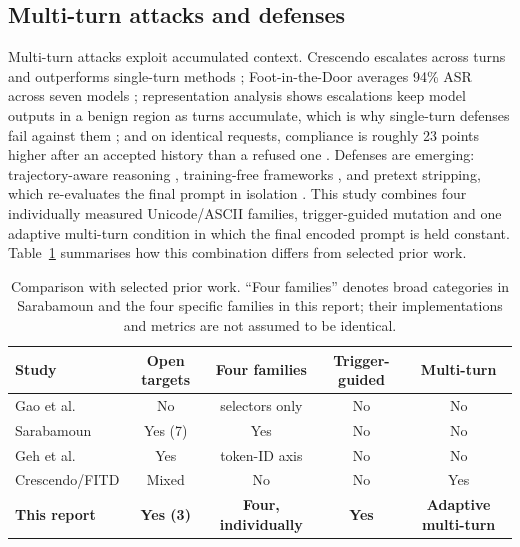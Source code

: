 \documentclass[a4paper,12pt]{article}
\begin{document}
\subsection{Multi-turn attacks and defenses}

Multi-turn attacks exploit accumulated context. Crescendo escalates across turns and
outperforms single-turn methods \cite{russinovich2024crescendo}; Foot-in-the-Door
averages 94\% ASR across seven models \cite{weng2025fitd}; representation analysis
shows escalations keep model outputs in a benign region as turns accumulate, which
is why single-turn defenses fail against them \cite{bullwinkel2025multiturn}; and on
identical requests, compliance is roughly 23 points higher after an accepted history
than a refused one \cite{hong2026threebench}. Defenses are emerging: trajectory-aware
reasoning \cite{chen2026trace}, training-free frameworks
\cite{zhang2026thrd}, and pretext stripping, which re-evaluates the final prompt in
isolation \cite{kumarappan2026deception}. This study combines four individually
measured Unicode/ASCII families, trigger-guided mutation and one adaptive multi-turn
condition in which the final encoded prompt is held constant. Table~\ref{tab:gap}
summarises how this combination differs from selected prior work.

\begin{table}[htbp]
\centering
\small
\begin{tabular}{p{3.4cm}cccc}
\toprule
Study & Open targets & Four families & Trigger-guided & Multi-turn \\
\midrule
Gao et al.\ \cite{pang2025imperceptible} & No & selectors only & No & No \\
Sarabamoun \cite{sarabamoun2025special} & Yes (7) & Yes & No & No \\
Geh et al.\ \cite{geh2025advtok} & Yes & token-ID axis & No & No \\
Crescendo/FITD \cite{russinovich2024crescendo,weng2025fitd} & Mixed & No & No & Yes \\
\textbf{This report} & \textbf{Yes (3)} & \textbf{Four, individually} & \textbf{Yes} & \textbf{Adaptive multi-turn} \\
\bottomrule
\end{tabular}
\caption{Comparison with selected prior work. ``Four families'' denotes broad
categories in Sarabamoun and the four specific families in this report; their
implementations and metrics are not assumed to be identical.}
\label{tab:gap}
\end{table}
\end{document}

